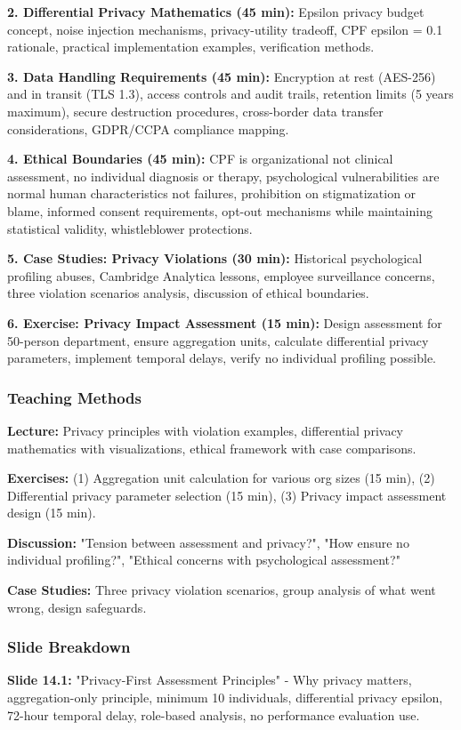 \documentclass[11pt,a4paper]{article}
\begin{document}
\textbf{2. Differential Privacy Mathematics (45 min):} Epsilon privacy budget concept, noise injection mechanisms, privacy-utility tradeoff, CPF epsilon = 0.1 rationale, practical implementation examples, verification methods.

\textbf{3. Data Handling Requirements (45 min):} Encryption at rest (AES-256) and in transit (TLS 1.3), access controls and audit trails, retention limits (5 years maximum), secure destruction procedures, cross-border data transfer considerations, GDPR/CCPA compliance mapping.

\textbf{4. Ethical Boundaries (45 min):} CPF is organizational not clinical assessment, no individual diagnosis or therapy, psychological vulnerabilities are normal human characteristics not failures, prohibition on stigmatization or blame, informed consent requirements, opt-out mechanisms while maintaining statistical validity, whistleblower protections.

\textbf{5. Case Studies: Privacy Violations (30 min):} Historical psychological profiling abuses, Cambridge Analytica lessons, employee surveillance concerns, three violation scenarios analysis, discussion of ethical boundaries.

\textbf{6. Exercise: Privacy Impact Assessment (15 min):} Design assessment for 50-person department, ensure aggregation units, calculate differential privacy parameters, implement temporal delays, verify no individual profiling possible.

\subsubsection{Teaching Methods}
\textbf{Lecture:} Privacy principles with violation examples, differential privacy mathematics with visualizations, ethical framework with case comparisons.

\textbf{Exercises:} (1) Aggregation unit calculation for various org sizes (15 min), (2) Differential privacy parameter selection (15 min), (3) Privacy impact assessment design (15 min).

\textbf{Discussion:} "Tension between assessment and privacy?", "How ensure no individual profiling?", "Ethical concerns with psychological assessment?"

\textbf{Case Studies:} Three privacy violation scenarios, group analysis of what went wrong, design safeguards.

\subsubsection{Slide Breakdown}
\textbf{Slide 14.1:} "Privacy-First Assessment Principles" - Why privacy matters, aggregation-only principle, minimum 10 individuals, differential privacy epsilon, 72-hour temporal delay, role-based analysis, no performance evaluation use.
\end{document}
